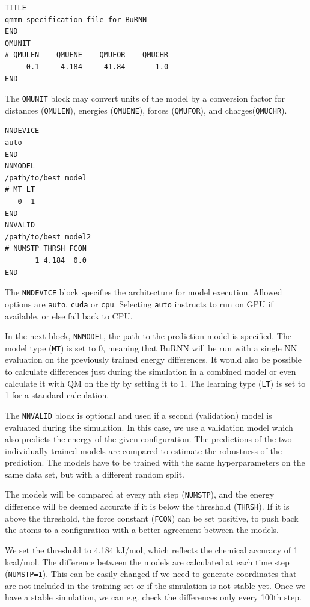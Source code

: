 \begin{lstlisting}[breaklines=true, breakatwhitespace=false]
TITLE
qmmm specification file for BuRNN  
END
QMUNIT
# QMULEN    QMUENE    QMUFOR    QMUCHR
     0.1     4.184    -41.84       1.0
END
\end{lstlisting}

The \texttt{QMUNIT} block may convert units of the model by a conversion factor for distances (\texttt{QMULEN}), energies (\texttt{QMUENE}), forces (\texttt{QMUFOR}), and charges(\texttt{QMUCHR}).

\begin{lstlisting}[breaklines=true, breakatwhitespace=false]
NNDEVICE
auto
END
NNMODEL
/path/to/best_model
# MT LT
   0  1
END
NNVALID
/path/to/best_model2
# NUMSTP THRSH FCON 
       1 4.184  0.0
END
\end{lstlisting}


The \texttt{NNDEVICE} block specifies the architecture for model execution. Allowed options are \texttt{auto}, \texttt{cuda} or \texttt{cpu}. Selecting \texttt{auto} instructs to run on GPU if available, or else fall back to CPU.

In the next block, \texttt{NNMODEL}, the path to the prediction model is specified. The model type (\texttt{MT}) is set to 0, meaning that BuRNN will be run with a single NN evaluation on the previously trained energy differences. It would also be possible to calculate differences just during the simulation in a combined model or even calculate it with QM on the fly by setting it to 1. The learning type (\texttt{LT}) is set to 1 for a standard calculation. 

The \texttt{NNVALID} block is optional and used if a second (validation) model is evaluated during the simulation. In this case, we use a validation model which also predicts the energy of the given configuration. The predictions of the two individually trained models are compared to estimate the robustness of the prediction. The models have to be trained with the same hyperparameters on the same data set, but with a different random split.

The models will be compared at every nth step (\texttt{NUMSTP}), and the energy difference will be deemed accurate if it is below the threshold (\texttt{THRSH}). If it is above the threshold, the force constant (\texttt{FCON}) can be set positive, to push back the atoms to a configuration with a better agreement between the models. 

We set the threshold to 4.184 kJ/mol, which reflects the chemical accuracy of 1 kcal/mol. The difference between the models are calculated at each time step (\texttt{NUMSTP=1}). This can be easily changed if we need to generate coordinates that are not included in the training set or if the simulation is not stable yet. Once we have a stable simulation, we can e.g. check the differences only every 100th step.

